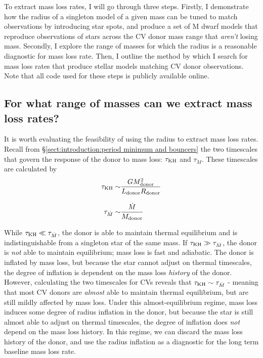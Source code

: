 To extract mass loss rates, I will go through three steps.
Firstly, I demonstrate how the radius of a singleton model of a given mass can be tuned to match observations by introducing star spots, and produce a set of M dwarf models that reproduce observations of stars across the CV donor mass range that \textit{aren't} losing mass.
Secondly, I explore the range of masses for which the radius is a reasonable diagnostic for mass loss rate.
Then, I outline the method by which I search for mass loss rates that produce stellar models matching CV donor observations.
Note that all code used for these steps is publicly available online.


\subsection{For what range of masses can we extract mass loss rates?}
\label{sect:modelling:MESA massloss allowable mass range}

It is worth evaluating the feasibility of using the radius to extract mass loss rates. Recall from \S\ref{sect:introduction:period minimum and bouncers} the two timescales that govern the response of the donor to mass loss: $\tau_{\rm KH}$ and $\tau_{\dot M}$. These timescales are calculated by
\begin{align}
    \tau_{\rm KH} \sim& \frac{G M_{\rm donor}^2}{L_{\rm donor} R_{\rm donor}} \\[8pt]
    \tau_{\dot M} \sim& \frac{\dot M}{M_{\rm donor}}
\end{align}

While $\tau_{\rm KH} \ll \tau_{\dot M}$, the donor is able to maintain thermal equilibrium and is indistinguishable from a singleton star of the same mass.
If $\tau_{\rm KH} \gg \tau_{\dot M}$, the donor is \textit{not} able to maintain equilibrium; mass loss is fast and adiabatic. The donor is inflated by mass loss, but because the star cannot adjust on thermal timescales, the degree of inflation is dependent on the mass loss \textit{history} of the donor.
However, calculating the two timescales for CVs reveals that $\tau_{\rm KH} \sim \tau_{\dot M}$ \citep{knigge11} - meaning that most CV donors are \textit{almost} able to maintain thermal equilibrium, but are still mildly affected by mass loss.
Under this almost-equilibrium regime, mass loss induces some degree of radius inflation in the donor, but because the star is still almost able to adjust on thermal timescales, the degree of inflation does \textit{not} depend on the mass loss history. In this regime, we can discard the mass loss history of the donor, and use the radius inflation as a diagnostic for the long term baseline mass loss rate.

